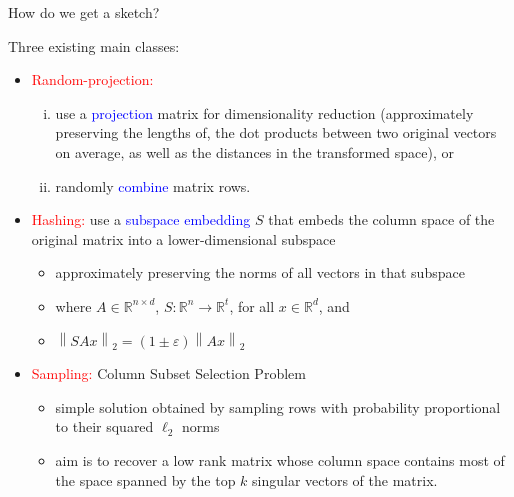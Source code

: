 \documentclass[first=dgreen,second=purple,logo=redque]{aaltoslides}
\newcommand{\vectornorm}[1]{\left\|#1\right\|}
\begin{document}
\begin{frame}[allowframebreaks=1]{How do we get a sketch?}

Three existing main classes:
\begin{itemize}
\item \textcolor{red}{Random-projection:} 
	\begin{enumerate}[(i)]
	
		\item use a \textcolor{blue}{projection} matrix for dimensionality reduction (\textcolor{dgreen}{approximately} preserving the lengths of, the dot products between two original vectors on average, as well as the distances in the transformed space), or
		\item randomly \textcolor{blue}{combine} matrix rows.
	\end{enumerate}
\item \textcolor{red}{Hashing:} use a \textcolor{blue}{subspace embedding} $S$ that embeds the column space of the original matrix into a lower-dimensional subspace
	\begin{itemize}
		\item \textcolor{dgreen}{approximately} preserving the norms of all vectors in that subspace
		\item where $A \in \mathbb{R}^{n \times d}$, $S : \mathbb{R}^{n} \rightarrow \mathbb{R}^{t}$, for all $x \in \mathbb{R}^{d}$, and
		\item $\vectornorm{SAx}_{2} = (1 \pm \varepsilon)\vectornorm{Ax}_{2}$
	\end{itemize}
\end{itemize}

\framebreak

\begin{itemize}
\item \textcolor{red}{Sampling:} \textcolor{dgreen}{Column Subset Selection Problem}
	\begin{itemize}
		\item simple solution obtained by sampling rows with probability proportional to their squared $\ell_{2}$ norms
		\item aim is to recover a low rank matrix whose column space contains most of the space spanned by the top $k$ \textcolor{dgreen}{singular vectors} of the matrix.
	\end{itemize}
	

\end{itemize}
\end{frame}
\end{document}

